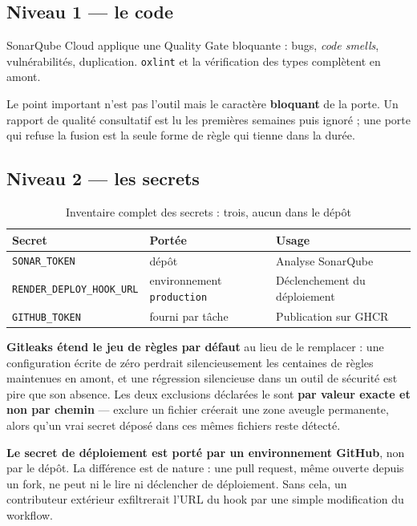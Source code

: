 \documentclass[11pt,a4paper]{article}
\begin{document}
\subsection{Niveau 1 — le code}

SonarQube Cloud applique une Quality Gate bloquante : bugs, \textit{code
smells}, vulnérabilités, duplication. \texttt{oxlint} et la vérification des
types complètent en amont.

Le point important n'est pas l'outil mais le caractère \textbf{bloquant} de
la porte. Un rapport de qualité consultatif est lu les premières semaines
puis ignoré ; une porte qui refuse la fusion est la seule forme de règle qui
tienne dans la durée.

\subsection{Niveau 2 — les secrets}

\begin{table}[htbp]
\centering
\small
\begin{tabular}{@{}l l l@{}}
\toprule
\textbf{Secret} & \textbf{Portée} & \textbf{Usage} \\
\midrule
\texttt{SONAR\_TOKEN}            & dépôt                      & Analyse SonarQube \\
\texttt{RENDER\_DEPLOY\_HOOK\_URL} & environnement \texttt{production} & Déclenchement du déploiement \\
\texttt{GITHUB\_TOKEN}           & fourni par tâche           & Publication sur GHCR \\
\bottomrule
\end{tabular}
\caption{Inventaire complet des secrets : trois, aucun dans le dépôt}
\end{table}

\textbf{Gitleaks étend le jeu de règles par défaut} au lieu de le remplacer :
une configuration écrite de zéro perdrait silencieusement les centaines de
règles maintenues en amont, et une régression silencieuse dans un outil de
sécurité est pire que son absence. Les deux exclusions déclarées le sont
\textbf{par valeur exacte et non par chemin} — exclure un fichier créerait
une zone aveugle permanente, alors qu'un vrai secret déposé dans ces mêmes
fichiers reste détecté.

\textbf{Le secret de déploiement est porté par un environnement GitHub}, non
par le dépôt. La différence est de nature : une pull request, même ouverte
depuis un fork, ne peut ni le lire ni déclencher de déploiement. Sans cela,
un contributeur extérieur exfiltrerait l'URL du hook par une simple
modification du workflow.
\end{document}
